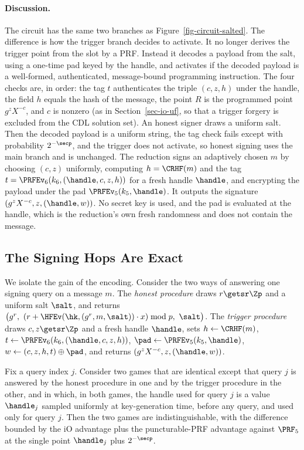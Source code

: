 \paragraph*{Discussion.} The circuit has the same two branches as Figure~\ref{fig-circuit-salted}. The difference is how the trigger branch decides to activate. It no longer derives the trigger point from the slot by a PRF. Instead it decodes a payload from the salt, using a one-time pad keyed by the handle, and activates if the decoded payload is a well-formed, authenticated, message-bound programming instruction. The four checks are, in order: the tag $t$ authenticates the triple $(c, z, h)$ under the handle, the field $h$ equals the hash of the message, the point $R$ is the programmed point $g^{z} X^{-c}$, and $c$ is nonzero (as in Section~\ref{sec-io-uf}, so that a trigger forgery is excluded from the CDL solution set). An honest signer draws a uniform salt. Then the decoded payload is a uniform string, the tag check fails except with probability $2^{-\secp}$, and the trigger does not activate, so honest signing uses the main branch and is unchanged. The reduction signs an adaptively chosen $m$ by choosing $(c, z)$ uniformly, computing $h = \CRHF(m)$ and the tag $t = \PRFEv_6(k_6, (\handle, c, z, h))$ for a fresh handle $\handle$, and encrypting the payload under the pad $\PRFEv_5(k_5, \handle)$. It outputs the signature $(g^{z} X^{-c}, z, (\handle, w))$. No secret key is used, and the pad is evaluated at the handle, which is the reduction's own fresh randomness and does not contain the message.

\subsection{The Signing Hops Are Exact} \label{sec-poly-lemma}

We isolate the gain of the encoding. Consider the two ways of answering one signing query on a message $m$. The \emph{honest procedure} draws $r \getsr \Zp$ and a uniform salt $\salt$, and returns $\big(g^r,\ (r + \HFEv(\hk, (g^r, m, \salt)) \cdot x) \bmod p,\ \salt\big)$. The \emph{trigger procedure} draws $c, z \getsr \Zp$ and a fresh handle $\handle$, sets $h \gets \CRHF(m)$, $t \gets \PRFEv_6(k_6, (\handle, c, z, h))$, $\pad \gets \PRFEv_5(k_5, \handle)$, $w \gets (c, z, h, t) \oplus \pad$, and returns $(g^{z} X^{-c}, z, (\handle, w))$.

\begin{lemma} \label{lem-exact-sign}
Fix a query index $j$. Consider two games that are identical except that query $j$ is answered by the honest procedure in one and by the trigger procedure in the other, and in which, in both games, the handle used for query $j$ is a value $\handle_j$ sampled uniformly at key-generation time, before any query, and used only for query $j$. Then the two games are indistinguishable, with the difference bounded by the iO advantage plus the puncturable-PRF advantage against $\PRF_5$ at the single point $\handle_j$ plus $2^{-\secp}$.
\end{lemma}

